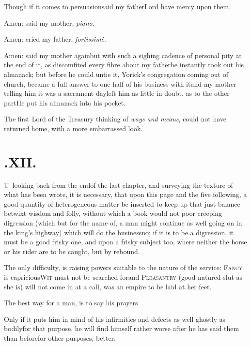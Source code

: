 \documentclass{article}
\begin{document}
\tsh Though if it comes to persuasion\break\tsk said my
father\tsk Lord have mercy upon them.

Amen: said my mother, \textit{piano}.

Amen: cried my father, \textit{fortissimè}.

\newpage
Amen: said my mother again\tsh but with such a sighing
cadence of personal pity at the end of it, as discomfited every
fibre about my father\tsk he instantly took out his almanack; but
before he could untie it, Yorick’s congregation coming
out of church, became a full answer to one half of his business
with it\tsk and my mother telling him it was a sacrament day\tsk left
him as little in doubt, as to the other part\tsk He put his
almanack into his pocket.

The first Lord of the Treasury thinking of \textit{ways and
means}, could not have returned home, with a more embarrassed
look.

\newpage
\section{.\enspace XII.}

\lettrine{U}{\,} looking back from the end\break of the last chapter, and surveying
the texture of what has been wrote, it is necessary, that upon this page and the
five following, a good quantity of hete\-rogeneous matter be inserted to keep up that
just balance betwixt wisdom and folly, without which a book would not
 poor creeping digression (which but for the name of, a
man might continue as well going on in the king’s highway) which will do the
business\tsh no; if it is to be a digression, it must be a good frisky one, and
upon a frisky subject too, where neither the horse or his rider are to be caught,
but by rebound.

The only difficulty, is raising powers suitable to the nature of the service:
\textsc{Fancy} is capricious\tsk \textsc{Wit} must not be searched for\tsk and
\textsc{Pleasantry} (good-natured slut as she is) will not come in at a call, was an
empire to be laid at her feet.

\tsh The best way for a man, is to say his prayers\tsh

Only if it puts him in mind of his in\-firmities and defects as
well ghostly as bodily\tsk for that purpose, he will find himself
rather worse after he has said them than before\tsk for other
purposes, better.
\end{document}
